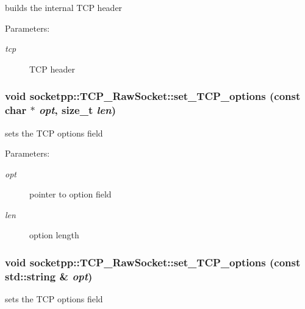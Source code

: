builds the internal TCP header 

\begin{Desc}
\item[Parameters:]
\begin{description}
\item[{\em tcp}]TCP header \end{description}
\end{Desc}
\hypertarget{classsocketpp_1_1TCP__RawSocket_c38e057fc6ece02026e71b7ee872533f}{
\subsubsection{\setlength{\rightskip}{0pt plus 5cm}void socketpp::TCP\_\-RawSocket::set\_\-TCP\_\-options (const char $\ast$ {\em opt}, \/  size\_\-t {\em len})}}
\label{classsocketpp_1_1TCP__RawSocket_c38e057fc6ece02026e71b7ee872533f}


sets the TCP options field 

\begin{Desc}
\item[Parameters:]
\begin{description}
\item[{\em opt}]pointer to option field \item[{\em len}]option length \end{description}
\end{Desc}
\hypertarget{classsocketpp_1_1TCP__RawSocket_7bc9043e86c6f328cb99d98c4bfca05a}{
\subsubsection{\setlength{\rightskip}{0pt plus 5cm}void socketpp::TCP\_\-RawSocket::set\_\-TCP\_\-options (const std::string \& {\em opt})}}
\label{classsocketpp_1_1TCP__RawSocket_7bc9043e86c6f328cb99d98c4bfca05a}


sets the TCP options field 

